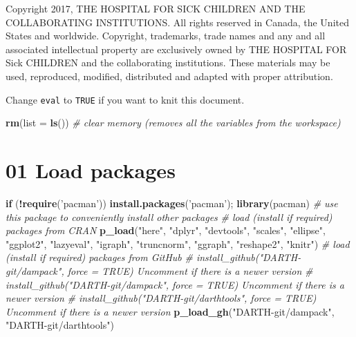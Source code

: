 \documentclass[]{article}
\newenvironment{Shaded}{\begin{snugshade}}{\end{snugshade}}
\newcommand{\KeywordTok}[1]{\textcolor[rgb]{0.13,0.29,0.53}{\textbf{#1}}}
\newcommand{\DataTypeTok}[1]{\textcolor[rgb]{0.13,0.29,0.53}{#1}}
\newcommand{\StringTok}[1]{\textcolor[rgb]{0.31,0.60,0.02}{#1}}
\newcommand{\CommentTok}[1]{\textcolor[rgb]{0.56,0.35,0.01}{\textit{#1}}}
\newcommand{\ControlFlowTok}[1]{\textcolor[rgb]{0.13,0.29,0.53}{\textbf{#1}}}
\newcommand{\OperatorTok}[1]{\textcolor[rgb]{0.81,0.36,0.00}{\textbf{#1}}}
\newcommand{\NormalTok}[1]{#1}
\begin{document}
Copyright 2017, THE HOSPITAL FOR SICK CHILDREN AND THE COLLABORATING
INSTITUTIONS. All rights reserved in Canada, the United States and
worldwide. Copyright, trademarks, trade names and any and all associated
intellectual property are exclusively owned by THE HOSPITAL FOR Sick
CHILDREN and the collaborating institutions. These materials may be
used, reproduced, modified, distributed and adapted with proper
attribution.

\newpage

Change \texttt{eval} to \texttt{TRUE} if you want to knit this document.

\begin{Shaded}
\begin{Highlighting}[]
\KeywordTok{rm}\NormalTok{(}\DataTypeTok{list =} \KeywordTok{ls}\NormalTok{())      }\CommentTok{# clear memory (removes all the variables from the workspace)}
\end{Highlighting}
\end{Shaded}

\section{01 Load packages}\label{load-packages}

\begin{Shaded}
\begin{Highlighting}[]
\ControlFlowTok{if}\NormalTok{ (}\OperatorTok{!}\KeywordTok{require}\NormalTok{(}\StringTok{'pacman'}\NormalTok{)) }\KeywordTok{install.packages}\NormalTok{(}\StringTok{'pacman'}\NormalTok{); }\KeywordTok{library}\NormalTok{(pacman) }\CommentTok{# use this package to conveniently install other packages}
\CommentTok{# load (install if required) packages from CRAN}
\KeywordTok{p_load}\NormalTok{(}\StringTok{"here"}\NormalTok{, }\StringTok{"dplyr"}\NormalTok{, }\StringTok{"devtools"}\NormalTok{, }\StringTok{"scales"}\NormalTok{, }\StringTok{"ellipse"}\NormalTok{, }\StringTok{"ggplot2"}\NormalTok{, }\StringTok{"lazyeval"}\NormalTok{, }\StringTok{"igraph"}\NormalTok{, }\StringTok{"truncnorm"}\NormalTok{, }\StringTok{"ggraph"}\NormalTok{, }\StringTok{"reshape2"}\NormalTok{, }\StringTok{"knitr"}\NormalTok{)                                               }
\CommentTok{# load (install if required) packages from GitHub}
\CommentTok{# install_github("DARTH-git/dampack", force = TRUE) Uncomment if there is a newer version}
\CommentTok{# install_github("DARTH-git/dampack", force = TRUE) Uncomment if there is a newer version}
\CommentTok{# install_github("DARTH-git/darthtools", force = TRUE) Uncomment if there is a newer version}
\KeywordTok{p_load_gh}\NormalTok{(}\StringTok{"DARTH-git/dampack"}\NormalTok{, }\StringTok{"DARTH-git/darthtools"}\NormalTok{)}
\end{Highlighting}
\end{Shaded}
\end{document}
